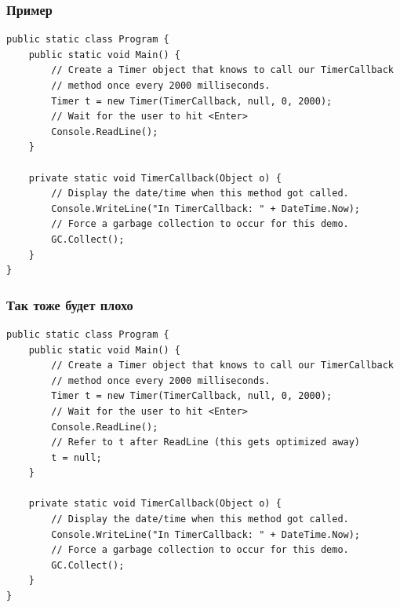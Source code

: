 \documentclass[xetex,mathserif,serif]{beamer}
\begin{document}
	\begin{frame}[fragile]
		\frametitle{Пример}
		\begin{footnotesize}
			\begin{verbatim}
public static class Program {
    public static void Main() {
        // Create a Timer object that knows to call our TimerCallback
        // method once every 2000 milliseconds.
        Timer t = new Timer(TimerCallback, null, 0, 2000);
        // Wait for the user to hit <Enter>
        Console.ReadLine();
    }

    private static void TimerCallback(Object o) {
        // Display the date/time when this method got called.
        Console.WriteLine("In TimerCallback: " + DateTime.Now);
        // Force a garbage collection to occur for this demo.
        GC.Collect();
    }
}
			\end{verbatim}
		\end{footnotesize}
	\end{frame}

	\begin{frame}[fragile]
		\frametitle{Так тоже будет плохо}
		\begin{footnotesize}
			\begin{verbatim}
public static class Program {
    public static void Main() {
        // Create a Timer object that knows to call our TimerCallback
        // method once every 2000 milliseconds.
        Timer t = new Timer(TimerCallback, null, 0, 2000);
        // Wait for the user to hit <Enter>
        Console.ReadLine();
        // Refer to t after ReadLine (this gets optimized away)
        t = null;
    }

    private static void TimerCallback(Object o) {
        // Display the date/time when this method got called.
        Console.WriteLine("In TimerCallback: " + DateTime.Now);
        // Force a garbage collection to occur for this demo.
        GC.Collect();
    }
}
			\end{verbatim}
		\end{footnotesize}
	\end{frame}
\end{document}
